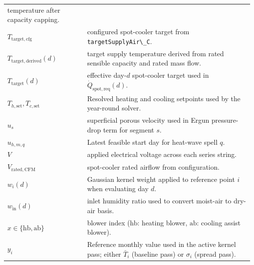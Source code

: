 {\begin{longtable}[]{@{}
  >{\raggedright\arraybackslash}p{}
  >{\raggedright\arraybackslash}p{}@{}}
temperature after capacity capping. \\
\(T_{\mathrm{target,cfg}}\) & configured spot-cooler target from
\texttt{targetSupplyAir\textbackslash{}\_C}. \\
\(T_{\mathrm{target,derived}}(d)\) & target supply temperature derived
from rated sensible capacity and rated mass flow. \\
\(T_{\mathrm{target}}(d)\) & effective day-\(d\) spot-cooler target used
in \(\dot Q_{\mathrm{spot,req}}(d)\). \\
\(T_{h,\mathrm{set}},T_{c,\mathrm{set}}\) & Resolved heating and cooling
setpoints used by the year-round solver. \\
\(u_s\) & superficial porous velocity used in Ergun pressure-drop term
for segment \(s\). \\
\(u_{h,m,q}\) & Latest feasible start day for heat-wave spell \(q\). \\
\(V\) & applied electrical voltage across each series string. \\
\(V_{\mathrm{rated,CFM}}\) & spot-cooler rated airflow from
configuration. \\
\(w_i(d)\) & Gaussian kernel weight applied to reference point \(i\)
when evaluating day \(d\). \\
\(w_{\mathrm{in}}(d)\) & inlet humidity ratio used to convert moist-air
to dry-air basis. \\
\(x\in\{\mathrm{hb},\mathrm{ab}\}\) & blower index (\(\mathrm{hb}\):
heating blower, \(\mathrm{ab}\): cooling assist blower). \\
\(y_i\) & Reference monthly value used in the active kernel pass; either
\(\bar T_i\) (baseline pass) or \(\sigma_i\) (spread pass). \\
\end{longtable}
}
